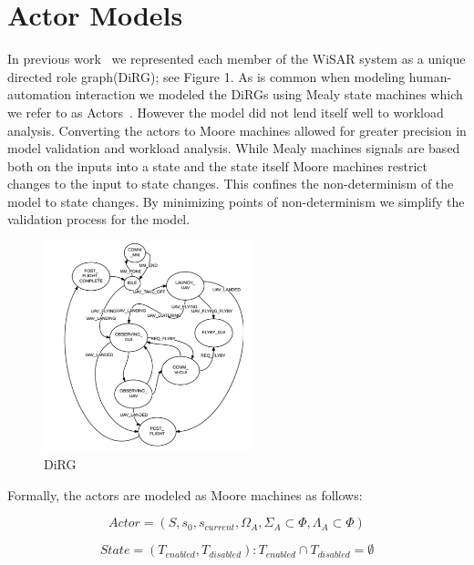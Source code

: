 \section{Actor Models} 

In previous work~\cite{gledhill2013modelinguas} we represented each member of the WiSAR system as a unique directed role graph(DiRG); see Figure 1. As is common
when modeling human-automation interaction we modeled the DiRGs using Mealy state machines which we refer to as Actors~\cite{bolton2013litreview}. However the model did not lend itself well to workload analysis. Converting the actors to Moore machines allowed for greater precision in model validation and workload analysis. While Mealy machines signals are based both on the inputs into a state and the state itself Moore machines restrict changes to the input to state changes. This confines the non-determinism of the model to state changes. By minimizing points of non-determinism we simplify the validation process for the model.

\begin{figure}[h]
\center
\setlength{\abovecaptionskip}{1mm}
\setlength{\belowcaptionskip}{1mm}
\setlength{\textfloatsep}{1mm}
\setlength{\floatsep}{1mm}
\includegraphics[height=2.4in]{DiRG.png}
\caption{DiRG}
\label{fig:dirg}
\end{figure}

Formally, the actors are modeled as Moore machines as follows:

\begin{equation}
 	Actor = (S, s_0, s_{current}, \Omega_A, \Sigma_A \subset \Phi, \Lambda_A
 	\subset \Phi)
 \label{eq:actor}
 \end{equation}

 \begin{equation}
	State = (T_{enabled}, T_{disabled}) : T_{enabled} \cap T_{disabled} = \emptyset
 \label{eq:state}
\end{equation}

